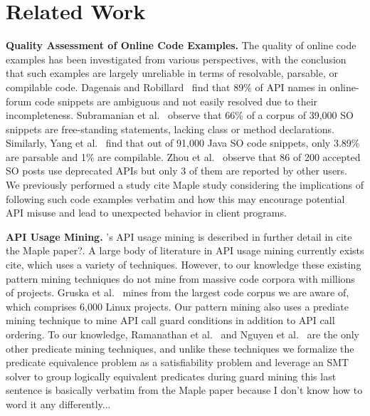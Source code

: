 \section{Related Work} 
{\bf Quality Assessment of Online Code Examples.} The quality of online code examples has been investigated from various perspectives, with the conclusion that such examples are largely unreliable in terms of resolvable, parsable, or compilable code. Dagenais and Robillard~\cite{dagenais2012recovering} find that 89\% of API names in online-forum code snippets are ambiguous and not easily resolved due to their incompleteness. Subramanian et al.~\cite{subramanian2013making} observe that 66\% of a corpus of 39,000 SO snippets are free-standing statements, lacking class or method declarations. Similarly, Yang et al.~\cite{yang2016query} find that out of 91,000 Java SO code snippets, only 3.89\% are parsable and 1\% are compilable. Zhou et al.~\cite{zhou2016api} observe that 86 of 200 accepted SO posts use deprecated APIs but only 3 of them are reported by other users. We previously performed a study {\todo cite Maple study} considering the implications of following such code examples verbatim and how this may encourage potential API misuse and lead to unexpected behavior in client programs.

{\bf API Usage Mining.} {\soa}'s API usage mining is described in further detail in {\todo cite the Maple paper?}. A large body of literature in API usage mining currently exists {\todo cite}, which uses a variety of techniques. However, to our knowledge these existing pattern mining techniques do not mine from massive code corpora with millions of projects. Gruska et al.~\cite{gruska2010learning} mines from the largest code corpus we are aware of, which comprises 6,000 Linux projects. Our pattern mining also uses a prediate mining technique to mine API call guard conditions in addition to API call ordering. To our knowledge, Ramanathan et al.~\cite{ramanathan2007static} and Nguyen et al.~\cite{nguyen2014mining} are the only other predicate mining techniques, and unlike these techniques we formalize the predicate equivalence problem as a satisfiability problem and leverage an SMT solver to group logically equivalent predicates during guard mining {\todo this last sentence is basically verbatim from the Maple paper because I don't know how to word it any differently...}

